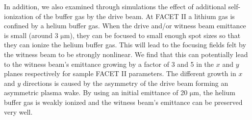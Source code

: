 \documentclass[%
reprint, superscriptaddress,
 amsmath,amssymb, aps,
prstab,
]{revtex4-2}
\begin{document}
In addition, we also examined through simulations the effect of additional self-ionization of the buffer gas by the drive beam. At FACET II a lithium gas is confined by a helium buffer gas. When the drive
and/or witness beam emittance is small (around 3 $\mathrm{\mu m}$), they can be focused to small enough spot sizes so that they can
ionize the helium buffer gas. This will lead to the focusing fields felt by the witness
beam to be strongly nonlinear. We find that this can potentially lead to the witness beam's emittance growing by a factor of 3 and 5 in the $x$ and $y$ planes respectively for sample FACET II parameters. The different growth in $x$ and $y$ directions is caused by the asymmetry of the
drive beam forming an asymmetric plasma wake. By using an initial
emittance of 20 $\mathrm{\mu m}$, the helium buffer gas is weakly
ionized and the witness beam's emittance can be preserved very well. 
%
%
% 
% 
% 
% 
% 
\end{document}
